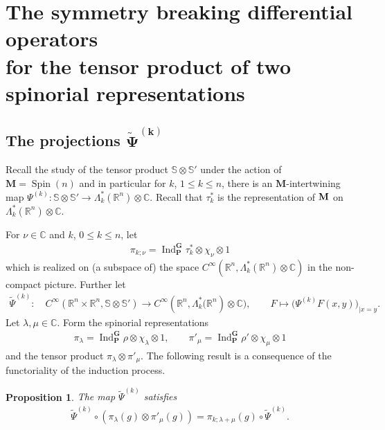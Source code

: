 \documentclass[pdftex]{sigma}
\DeclareMathOperator{\Spin}{Spin}
\DeclareMathOperator{\Ind}{Ind}
\numberwithin{equation}{section}
\newtheorem{prop}[theor]{Proposition}
\begin{document}
\section[The symmetry breaking differential operators for the tensor product of two spinorial representations]
{The symmetry breaking differential operators\\ for the tensor product of two spinorial representations}

\subsection[The projections tilde Psi(k)]{The projections $\boldsymbol{\widetilde \Psi^{(k)}}$}

Recall the study of the tensor product $\mathbb S\otimes \mathbb S'$ under the action of $\mathbf{M} = \Spin(n)$ and in particular
for $k$, $1\leq k\leq n$, there is an $\mathbf M$-intertwining map $\Psi^{(k)} \colon \mathbb S\otimes \mathbb{S}' \to \Lambda^*_k(\mathbb{R}^n)\otimes \mathbb C$. Recall that $\tau^*_k$ is the representation of $\bf M$ on $\Lambda^*_k(\mathbb{R}^n)\otimes\mathbb{C}$.

For $\nu\in \mathbb C$ and $k$, $0\leq k\leq n$, let
 \begin{gather*}
 \pi_{k;\nu} =\Ind_\mathbf P^\mathbf G{ \tau^*_k}\otimes \chi_\nu \otimes 1\end{gather*}
 which is realized on (a subspace of) the space $C^\infty(\mathbb R^n, \Lambda^*_k(\mathbb{R}^n)\otimes \mathbb C)$ in the non-compact picture. Further let
\begin{gather*}
\widetilde \Psi^{(k)} \colon\quad C^\infty(\mathbb R^n\times \mathbb R^n,
\mathbb S\otimes \mathbb{S}' )\to C^\infty( \mathbb R^n,
\Lambda^*_k\big(\mathbb R^n)\otimes\mathbb C\big),\qquad
F\mapsto \big(\Psi^{(k)}F(x,y)\big)_{\vert x=y}.
\end{gather*}
Let $\lambda, \mu \in \mathbb C$. Form the spinorial representations
\begin{gather*}
\pi_\lambda= \Ind_\mathbf P^\mathbf G \rho\otimes \chi_\lambda \otimes 1, \qquad \pi'_\mu= \Ind_\mathbf P^\mathbf G \rho'\otimes \chi_\mu\otimes 1
\end{gather*}
and the tensor product $\pi_\lambda \otimes \pi'_\mu$. The following result is a consequence of the functoriality of the induction process.

\begin{prop} The map $\widetilde \Psi^{(k)}$ satisfies
\begin{gather*}
\widetilde\Psi^{(k)}\circ (\pi_\lambda(g) \otimes \pi'_\mu(g)) = \pi_{k;\lambda+\mu}(g) \circ \widetilde\Psi^{(k)}.
\end{gather*}
\end{prop}
\end{document}
